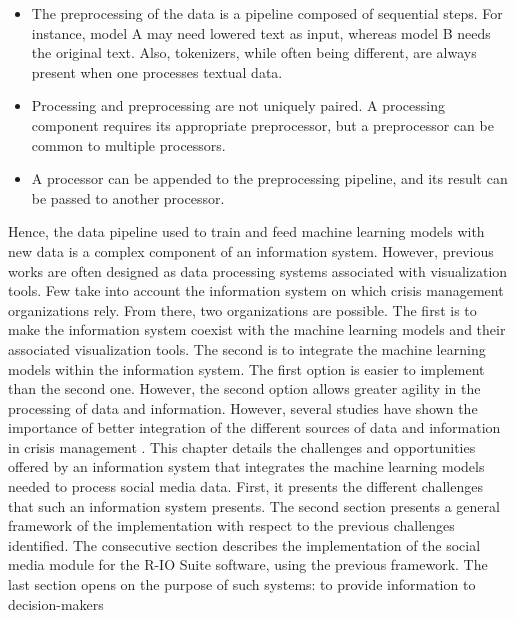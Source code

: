 \begin{itemize}
    \item The preprocessing of the data is a pipeline composed of sequential steps.
          For instance, model A may need lowered text as input, whereas model B needs the original text.
          Also, tokenizers, while often being different, are always present when one processes textual data.
    \item Processing and preprocessing are not uniquely paired. A processing component requires its appropriate preprocessor, but a preprocessor can be common to multiple processors.
    \item A processor can be appended to the preprocessing pipeline, and its result can be passed to another processor.
\end{itemize}

Hence, the data pipeline used to train and feed machine learning models with new data is a complex component of an information system.
However, previous works are often designed as data processing systems associated with visualization tools.
Few take into account the information system on which crisis management organizations rely.
From there, two organizations are possible.
The first is to make the information system coexist with the machine learning models and their associated visualization tools.
The second is to integrate the machine learning models within the information system.
The first option is easier to implement than the second one.
However, the second option allows greater agility in the processing of data and information.
However, several studies have shown the importance of better integration of the different sources of data and information in crisis management \parencite{comesBringingStructureDisaster2015,tapia2016scaling}.
This chapter details the challenges and opportunities offered by an information system that integrates the machine learning models needed to process social media data.
First, it presents the different challenges that such an information system presents.
The second section presents a general framework of the implementation with respect to the previous challenges identified.
The consecutive section describes the implementation of the social media module for the R-IO Suite software, using the previous framework.
The last section opens on the purpose of such systems: to provide information to decision-makers

